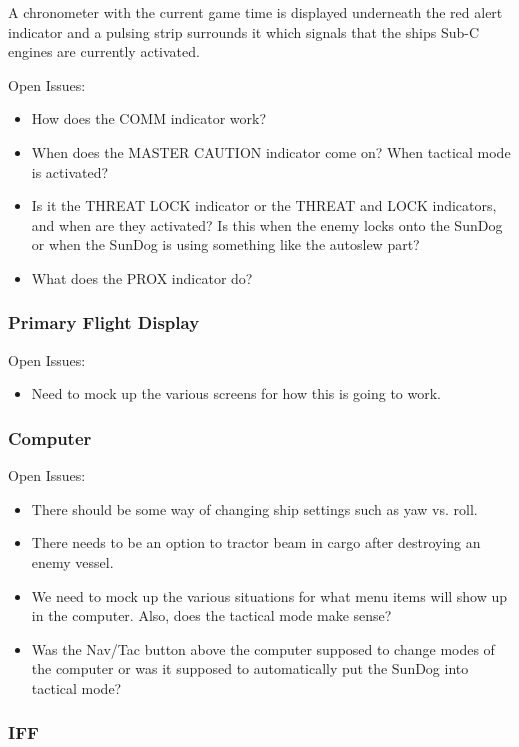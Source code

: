 A chronometer with the current game time is displayed underneath the red
alert indicator and a pulsing strip surrounds it which signals that the ships
Sub-C engines are currently activated.

Open Issues:
\begin{itemize}
\item How does the COMM indicator work?
\item When does the MASTER CAUTION indicator come on?  When tactical mode
is activated?
\item Is it the THREAT LOCK indicator or the THREAT and LOCK indicators,
and when are they activated?  Is this when the enemy locks onto the SunDog
or when the SunDog is using something like the autoslew part?
\item What does the PROX indicator do?
\end{itemize}

\subsubsection{Primary Flight Display}

Open Issues:
\begin{itemize}
\item Need to mock up the various screens for how this is going to work.
\end{itemize}

\subsubsection{Computer}

Open Issues:
\begin{itemize}
\item There should be some way of changing ship settings such as yaw vs.
roll.
\item There needs to be an option to tractor beam in cargo after
destroying an enemy vessel.
\item We need to mock up the various situations for what menu items
will show up in the computer.  Also, does the tactical mode make sense?
\item Was the Nav\slash Tac button above the computer supposed to change modes
of the computer or was it supposed to automatically put the SunDog into
tactical mode?
\end{itemize}

\subsubsection{IFF}

